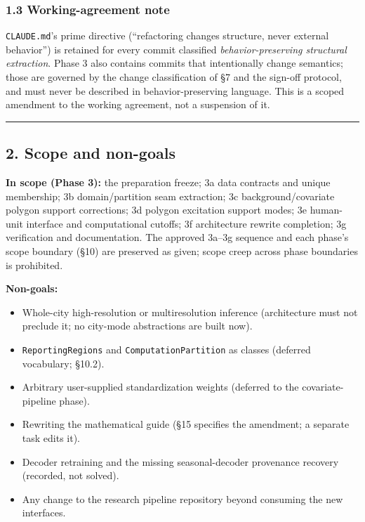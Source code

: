 \documentclass[
  10pt,
]{article}
\providecommand{\tightlist}{%
  \setlength{\itemsep}{0pt}\setlength{\parskip}{0pt}}
\begin{document}
\hypertarget{working-agreement-note}{%
\subsubsection{1.3 Working-agreement note}\label{working-agreement-note}}

\texttt{CLAUDE.md}'s prime directive (``refactoring changes structure, never external behavior'') is retained for every commit classified \emph{behavior-preserving structural extraction}. Phase 3 also contains commits that intentionally change semantics; those are governed by the change classification of §7 and the sign-off protocol, and must never be described in behavior-preserving language. This is a scoped amendment to the working agreement, not a suspension of it.

\begin{center}\rule{0.5\linewidth}{0.5pt}\end{center}

\hypertarget{scope-and-non-goals}{%
\subsection{2. Scope and non-goals}\label{scope-and-non-goals}}

\textbf{In scope (Phase 3):} the preparation freeze; 3a data contracts and unique membership; 3b domain/partition seam extraction; 3c background/covariate polygon support corrections; 3d polygon excitation support modes; 3e human-unit interface and computational cutoffs; 3f architecture rewrite completion; 3g verification and documentation. The approved 3a--3g sequence and each phase's scope boundary (§10) are preserved as given; scope creep across phase boundaries is prohibited.

\textbf{Non-goals:}

\begin{itemize}
\tightlist
\item
  Whole-city high-resolution or multiresolution inference (architecture must not preclude it; no city-mode abstractions are built now).
\item
  \texttt{ReportingRegions} and \texttt{ComputationPartition} as classes (deferred vocabulary; §10.2).
\item
  Arbitrary user-supplied standardization weights (deferred to the covariate-pipeline phase).
\item
  Rewriting the mathematical guide (§15 specifies the amendment; a separate task edits it).
\item
  Decoder retraining and the missing seasonal-decoder provenance recovery (recorded, not solved).
\item
  Any change to the research pipeline repository beyond consuming the new interfaces.
\end{itemize}
\end{document}
